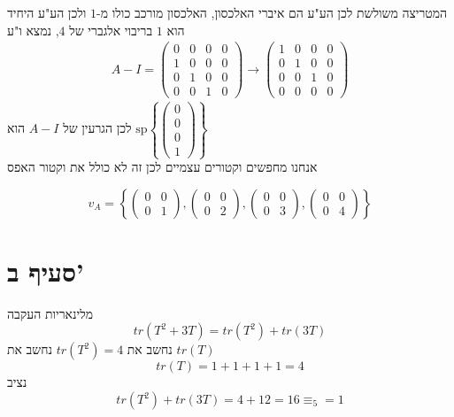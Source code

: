 \documentclass[12pt, titlepage]{article}
\begin{document}
המטריצה משולשת לכן הע"ע הם איברי האלכסון, האלכסון מורכב כולו מ-$1$ ולכן הע"ע היחיד הוא $1$ בריבוי אלגברי של $4$, נמצא ו"ע
\begin{gather*}
    A-I = \begin{pmatrix}
        0 & 0 & 0 & 0 \\
        1 & 0 & 0 & 0 \\
        0 & 1 & 0 & 0 \\
        0 & 0 & 1 & 0
    \end{pmatrix} \to \begin{pmatrix}
        1 & 0 & 0 & 0 \\
        0 & 1 & 0 & 0 \\
        0 & 0 & 1 & 0 \\
        0 & 0 & 0 & 0 
    \end{pmatrix}
\end{gather*}
לכן הגרעין של $A-I$ הוא $\mathrm{sp}\left\{\begin{pmatrix}0\\0\\0\\1\end{pmatrix}\right\}$\\
אנחנו מחפשים וקטורים עצמיים לכן זה לא כולל את וקטור האפס

\[
v_A  = \left\{ \begin{pmatrix} 0&0\\0&1\end{pmatrix},\begin{pmatrix} 0&0\\0&2\end{pmatrix},\begin{pmatrix} 0&0\\0&3\end{pmatrix},\begin{pmatrix} 0&0\\0&4\end{pmatrix} \right\}
\]
\section*{סעיף ב'}
מלינאריות העקבה
\[
    tr\left(T^2+3T\right) = tr\left(T^2\right) + tr\left(3T\right)
\]
נחשב את $tr(T^2)=4$
נחשב את $tr\left(T\right)$
\[
    tr\left(T\right) = 1+1+1+1 =4
\]
נציב
\[
    tr\left(T^2\right) + tr\left(3T\right) = 4+ 12 = 16 \equiv_5 = 1
\]
\end{document}
